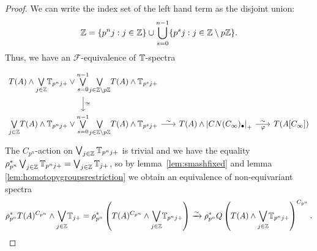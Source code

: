 \begin{proof}
We can write the index set of the left hand term
as the disjoint union:
\[
\mathbb{Z} = \{p^nj:j\in \mathbb{Z}\}\cup\bigcup_{s = 0}^{n-1}\{p^sj:j\in \mathbb{Z}\setminus p\mathbb{Z}\}.
\]
Thus, we have an $\mathcal{F}$-equivalence
of $\mathbb{T}$-spectra
\begin{equation}\label{eq:padic}
\begin{tikzcd}[column sep = scriptsize]
T(A)\wedge \underset{j\in \ZZ}{\bigvee}
\TT_{p^{n}j+}\vee
\overset{n-1}{\underset{s= 0}{\bigvee}}\underset{j\in \ZZ\setminus p\ZZ }{\bigvee}
T(A)\wedge \TT_{p^sj+} 
\arrow{d}{\cong}\\
\underset{j\in \ZZ}{\bigvee}T(A)\wedge \TT_{p^{n}j+}\vee
\overset{n-1}{\underset{s= 0}{\bigvee}}\underset{j\in \ZZ\setminus p\ZZ }{\bigvee}
T(A)\wedge \TT_{p^sj+} 
\arrow{r}{\sim} 
&T(A)\wedge \left| CN(C_\infty)_\bullet\right|_+ 
\arrow{r}[swap]{\varphi}{\sim}
&T(A[C_\infty])
\end{tikzcd}
\end{equation}
The $C_{p^n}$-action on $\bigvee_{j\in \mathbb{Z}} \mathbb{T}_{p^nj+}$ is trivial
and we have the equality $\rho_{p^n}^\ast \bigvee_{j\in \mathbb{Z}} \mathbb{T}_{p^nj+} = 
\bigvee_{j\in \mathbb{Z}} \mathbb{T}_{j+}$, so by
lemma~\ref{lem:smashfixed} and lemma
\ref{lem:homotopygroupsrestriction} we obtain an equivalence
of non-equivariant spectra
\begin{equation}\label{eq:pdivisible1}
\rho_{p^{n}}^\ast T(A)  ^{ C_{ p^{ n  } } }
\wedge 
\underset{j \in \mathbb{Z}}{\bigvee}\mathbb{T}_{j+} =
\rho_{p^{n}}^\ast \left(T(A)  ^{ C_{ p^{ n  } } }
\wedge 
\underset{j \in \mathbb{Z}}{\bigvee}\mathbb{T}_{p^nj+}\right)
\xrightarrow{\sim}
\rho_{p^n}^\ast Q\left(T(A)\wedge \underset{j \in \mathbb{Z}}{\bigvee}\mathbb{T}_{p^nj+}\right)^{C_{p^n}}.
\end{equation}


\end{proof}
